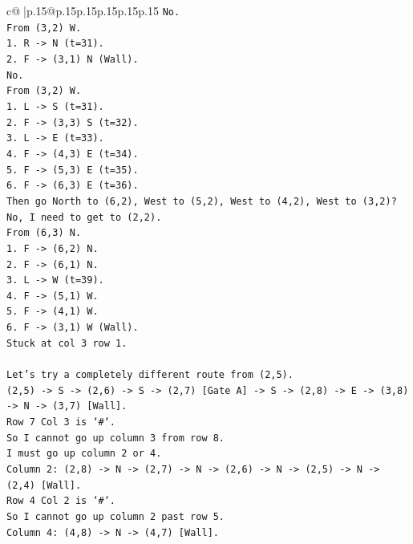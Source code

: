 \documentclass{article}
\begin{document}
{\begin{supertabular}{c@{$\;$}|p{.15\linewidth}@{}p{.15\linewidth}p{.15\linewidth}p{.15\linewidth}p{.15\linewidth}p{.15\linewidth}}
{{{\texttt{No.} \\
\texttt{From (3,2) W.} \\
\texttt{1. R {-}> N (t=31).} \\
\texttt{2. F {-}> (3,1) N (Wall).} \\
\texttt{No.} \\
\texttt{From (3,2) W.} \\
\texttt{1. L {-}> S (t=31).} \\
\texttt{2. F {-}> (3,3) S (t=32).} \\
\texttt{3. L {-}> E (t=33).} \\
\texttt{4. F {-}> (4,3) E (t=34).} \\
\texttt{5. F {-}> (5,3) E (t=35).} \\
\texttt{6. F {-}> (6,3) E (t=36).} \\
\texttt{Then go North to (6,2), West to (5,2), West to (4,2), West to (3,2)?} \\
\texttt{No, I need to get to (2,2).} \\
\texttt{From (6,3) N.} \\
\texttt{1. F {-}> (6,2) N.} \\
\texttt{2. F {-}> (6,1) N.} \\
\texttt{3. L {-}> W (t=39).} \\
\texttt{4. F {-}> (5,1) W.} \\
\texttt{5. F {-}> (4,1) W.} \\
\texttt{6. F {-}> (3,1) W (Wall).} \\
\texttt{Stuck at col 3 row 1.} \\
\\ 
\texttt{Let's try a completely different route from (2,5).} \\
\texttt{(2,5) {-}> S {-}> (2,6) {-}> S {-}> (2,7) {[}Gate A{]} {-}> S {-}> (2,8) {-}> E {-}> (3,8) {-}> N {-}> (3,7) {[}Wall{]}.} \\
\texttt{Row 7 Col 3 is `\#`.} \\
\texttt{So I cannot go up column 3 from row 8.} \\
\texttt{I must go up column 2 or 4.} \\
\texttt{Column 2: (2,8) {-}> N {-}> (2,7) {-}> N {-}> (2,6) {-}> N {-}> (2,5) {-}> N {-}> (2,4) {[}Wall{]}.} \\
\texttt{Row 4 Col 2 is `\#`.} \\
\texttt{So I cannot go up column 2 past row 5.} \\
\texttt{Column 4: (4,8) {-}> N {-}> (4,7) {[}Wall{]}.} \\
}}}
\end{supertabular}}
\end{document}
